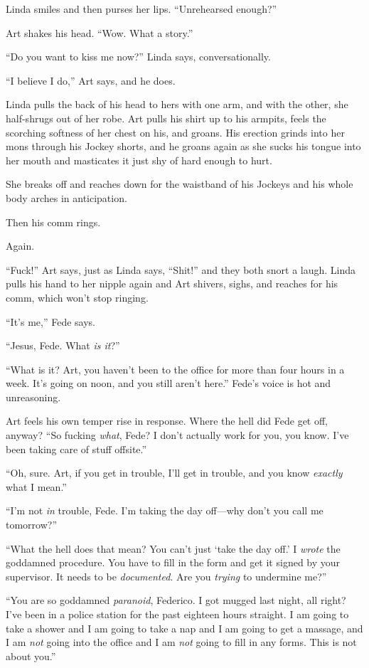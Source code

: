 Linda smiles and then purses her lips. “Unrehearsed enough?”

Art shakes his head. “Wow. What a story.”

“Do you want to kiss me now?” Linda says, conversationally.

“I believe I do,” Art says, and he does.

Linda pulls the back of his head to hers with one arm, and with the
other, she half-shrugs out of her robe. Art pulls his shirt up to
his armpits, feels the scorching softness of her chest on his, and
groans. His erection grinds into her mons through his Jockey
shorts, and he groans again as she sucks his tongue into her mouth
and masticates it just shy of hard enough to hurt.

She breaks off and reaches down for the waistband of his Jockeys
and his whole body arches in anticipation.

Then his comm rings.

Again.

“Fuck!” Art says, just as Linda says, “Shit!” and they both snort a
laugh. Linda pulls his hand to her nipple again and Art shivers,
sighs, and reaches for his comm, which won’t stop ringing.

“It’s me,” Fede says.

“Jesus, Fede. What \emph{is it}?”

“What is it? Art, you haven’t been to the office for more than four
hours in a week. It’s going on noon, and you still aren’t here.”
Fede’s voice is hot and unreasoning.

Art feels his own temper rise in response. Where the hell did Fede
get off, anyway? “So fucking \emph{what}, Fede? I don’t actually
work for you, you know. I’ve been taking care of stuff offsite.”

“Oh, sure. Art, if you get in trouble, I’ll get in trouble, and you
know \emph{exactly} what I mean.”

“I’m not \emph{in} trouble, Fede. I’m taking the day off—why don’t
you call me tomorrow?”

“What the hell does that mean? You can’t just ‘take the day off.’ I
\emph{wrote} the goddamned procedure. You have to fill in the form
and get it signed by your supervisor. It needs to be
\emph{documented}. Are you \emph{trying} to undermine me?”

“You are so goddamned \emph{paranoid}, Federico. I got mugged last
night, all right? I’ve been in a police station for the past
eighteen hours straight. I am going to take a shower and I am going
to take a nap and I am going to get a massage, and I am \emph{not}
going into the office and I am \emph{not} going to fill in any
forms. This is not about you.”

